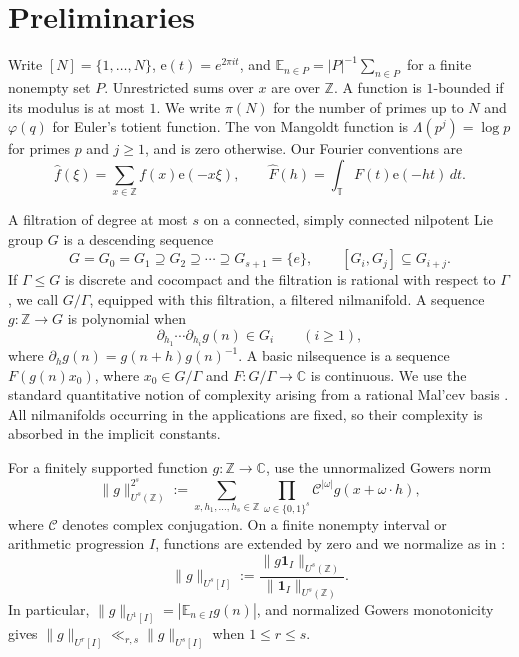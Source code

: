 \documentclass[12pt]{amsart}
\newcommand{\E}{\mathbb E}
\newcommand{\Z}{\mathbb Z}
\newcommand{\C}{\mathbb C}
\newcommand{\1}{\mathbf 1}
\newcommand{\e}{\mathrm e}
\theoremstyle{definition}
\begin{document}
\section{Preliminaries}\label{s:preliminaries}


Write \([N]=\{1,\ldots,N\}\), \(\e(t)=e^{2\pi i t}\), and
\(\E_{n\in P}=|P|^{-1}\sum_{n\in P}\) for a finite nonempty set \(P\).
Unrestricted sums over \(x\) are over \(\Z\).  A function is
\(1\)-bounded if its modulus is at most \(1\).
We write $\pi(N)$ for the number of primes up to $N$ and
$\varphi(q)$ for Euler's totient function. The von Mangoldt
function is $\Lambda(p^j)=\log p$ for primes $p$ and $j\geq1$,
and is zero otherwise. Our Fourier conventions are
\[
 \widehat f(\xi)=\sum_{x\in\mathbb Z}f(x)\e(-x\xi),
 \qquad
 \widehat F(h)=\int_{\mathbb T}F(t)\e(-ht)\,dt.
\]

A filtration of degree at most \(s\) on a connected, simply connected
nilpotent Lie group \(G\) is a descending sequence
\[
 G=G_0=G_1\supseteq G_2\supseteq\cdots\supseteq G_{s+1}=\{e\},
 \qquad [G_i,G_j]\subseteq G_{i+j}.
\]
If \(\Gamma\le G\) is discrete and cocompact and the filtration is
rational with respect to \(\Gamma\), we call \(G/\Gamma\), equipped with
this filtration, a filtered nilmanifold.  A sequence \(g:\Z\to G\) is
polynomial when
\[
 \partial_{h_1}\cdots\partial_{h_i}g(n)\in G_i
 \qquad(i\ge1),
\]
where \(\partial_hg(n)=g(n+h)g(n)^{-1}\).  A basic nilsequence is a
sequence \(F(g(n)x_0)\), where \(x_0\in G/\Gamma\) and
\(F:G/\Gamma\to\C\) is continuous.  We use the standard quantitative
notion of complexity arising from a rational Mal'cev basis
\cite[Section~2]{GreenTaoNil}.  All
nilmanifolds occurring in the applications are fixed, so their complexity
is absorbed in the implicit constants.

For a finitely supported function \(g:\mathbb Z\to\mathbb C\), use the
unnormalized Gowers norm
\[
 \|g\|_{U^s(\mathbb Z)}^{2^s}
 :=\sum_{x,h_1,\ldots,h_s\in\mathbb Z}
   \prod_{\omega\in\{0,1\}^s}
   \mathcal C^{|\omega|}g(x+\omega\cdot h),
\]
where \(\mathcal C\) denotes complex conjugation.  On a finite nonempty interval or arithmetic progression
\(I\), functions are extended by zero and we normalize as in
\cite[Section~2.3]{KMTT}:
\begin{equation}\label{e:normalized-gowers}
 \|g\|_{U^s[I]}
 :=\frac{\|g\mathbf1_I\|_{U^s(\mathbb Z)}}
          {\|\mathbf1_I\|_{U^s(\mathbb Z)}}.
\end{equation}
In particular, \(\|g\|_{U^1[I]}=|\mathbb E_{n\in I}g(n)|\), and
normalized Gowers monotonicity gives
\(\|g\|_{U^r[I]}\ll_{r,s}\|g\|_{U^s[I]}\) when \(1\le r\le s\).
\end{document}
